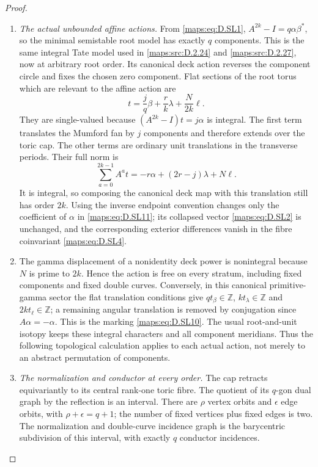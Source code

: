 \begin{proof}
\begin{enumerate}[label=\arabic*.,leftmargin=*]
\item \emph{The actual unbounded affine actions.}
From \eqref{maps:eq:D.SL1}, $A^{2k}-I=q\alpha\beta^*$, so the
minimal semistable root model has exactly $q$ components.
This is the same integral Tate model used in \ref{maps:src:D.2.24}
and \ref{maps:src:D.2.27}, now at arbitrary root order. Its canonical
deck action reverses the component circle and fixes
the chosen zero component. Flat sections of the root
torus which are relevant to the affine action are
\[
                t=\frac{j}{q}\beta+\frac r k\lambda
                                      +\frac{N}{2k}\ell.
                                                               \tag{D.SL10}\label{maps:eq:D.SL10}
\]
They are single-valued because
$(A^{2k}-I)t=j\alpha$ is integral. The first term
translates the Mumford fan by $j$ components and
therefore extends over the toric cap. The other
terms are ordinary unit translations in the
transverse periods. Their full norm is
\[
         \sum_{a=0}^{2k-1}A^a t
                     =-r\alpha+(2r-j)\lambda+N\ell.
                                                               \tag{D.SL11}\label{maps:eq:D.SL11}
\]
It is integral, so composing the canonical deck
map with this translation still has order $2k$.
Using the inverse endpoint convention changes
only the coefficient of $\alpha$ in \eqref{maps:eq:D.SL11};
its collapsed vector \eqref{maps:eq:D.SL2} is unchanged, and
the corresponding exterior differences vanish
in the fibre coinvariant \eqref{maps:eq:D.SL4}.

\item The gamma displacement of a nonidentity deck
power is nonintegral because $N$ is prime to
$2k$. Hence the action is free on every stratum,
including fixed components and fixed double
curves. Conversely, in this canonical primitive-
gamma sector the flat translation conditions
give $q t_\beta\in\mathbb Z$, $k t_\lambda\in\mathbb Z$
and $2k t_\ell\in\mathbb Z$; a remaining angular
translation is removed by conjugation since
$A\alpha=-\alpha$. This is the marking \eqref{maps:eq:D.SL10}.
The usual root-and-unit isotopy keeps these
integral characters and all component meridians.
Thus the following topological calculation
applies to each actual action, not merely to
an abstract permutation of components.

\item \emph{The normalization and conductor at every order.}
The cap retracts equivariantly to its central
rank-one toric fibre. The quotient of its
$q$-gon dual graph by the reflection is an
interval. There are $\rho$ vertex orbits and
$\epsilon$ edge orbits, with
$\rho+\epsilon=q+1$; the number of fixed vertices
plus fixed edges is two. The normalization
and double-curve incidence graph is the
barycentric subdivision of this interval,
with exactly $q$ conductor incidences.


\end{enumerate}
\end{proof}
